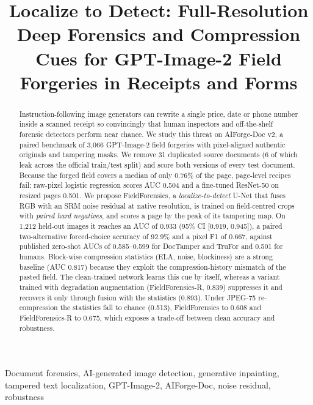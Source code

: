 \documentclass[conference]{IEEEtran}
\begin{document}
\title{Localize to Detect: Full-Resolution Deep Forensics and Compression Cues for GPT-Image-2 Field Forgeries in Receipts and Forms}
\author{
}
\maketitle
\begin{abstract}
Instruction-following image generators can rewrite a single price, date or phone number inside a scanned receipt so convincingly that human inspectors and off-the-shelf forensic detectors perform near chance. We study this threat on AIForge-Doc v2, a paired benchmark of 3,066 GPT-Image-2 field forgeries with pixel-aligned authentic originals and tampering masks. We remove 31 duplicated source documents (6 of which leak across the official train/test split) and score both versions of every test document. Because the forged field covers a median of only 0.76\% of the page, page-level recipes fail: raw-pixel logistic regression scores AUC 0.504 and a fine-tuned ResNet-50 on resized pages 0.501. We propose FieldForensics, a \emph{localize-to-detect} U-Net that fuses RGB with an SRM noise residual at native resolution, is trained on field-centred crops with \emph{paired hard negatives}, and scores a page by the peak of its tampering map. On 1,212 held-out images it reaches an AUC of 0.933 (95\% CI [0.919, 0.945]), a paired two-alternative forced-choice accuracy of 92.9\% and a pixel F1 of 0.667, against published zero-shot AUCs of 0.585--0.599 for DocTamper and TruFor and 0.501 for humans. Block-wise compression statistics (ELA, noise, blockiness) are a strong baseline (AUC 0.817) because they exploit the compression-history mismatch of the pasted field. The clean-trained network learns this cue by itself, whereas a variant trained with degradation augmentation (FieldForensics-R, 0.839) suppresses it and recovers it only through fusion with the statistics (0.893). Under JPEG-75 re-compression the statistics fall to chance (0.513), FieldForensics to 0.608 and FieldForensics-R to 0.675, which exposes a trade-off between clean accuracy and robustness.
\end{abstract}
\begin{IEEEkeywords}
Document forensics, AI-generated image detection, generative inpainting, tampered text localization, GPT-Image-2, AIForge-Doc, noise residual, robustness
\end{IEEEkeywords}
\end{document}

